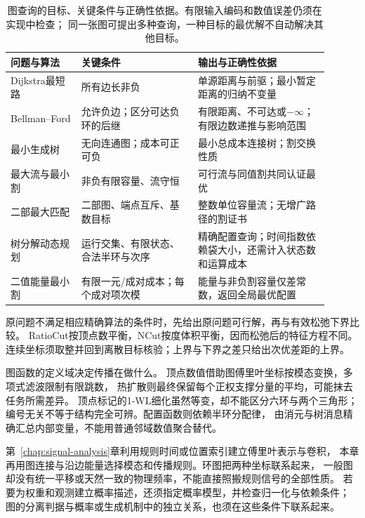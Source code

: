 \begin{table}[htbp]
  \centering
  \caption{图查询的目标、关键条件与正确性依据。有限输入编码和数值误差仍须在实现中检查；
  同一张图可提出多种查询，一种目标的最优解不自动解决其他目标。}
  \label{tab:graph-algorithm-conditions}
  \begin{tabular}{p{0.20\linewidth}p{0.33\linewidth}p{0.37\linewidth}}
    \toprule
    问题与算法 & 关键条件 & 输出与正确性依据\\
    \midrule
    Dijkstra最短路 & 所有边长非负 & 单源距离与前驱；最小暂定距离的归纳不变量\\
    Bellman--Ford & 允许负边；区分可达负环的后继 & 有限距离、不可达或\(-\infty\)；
      有限边数递推与影响范围\\
    最小生成树 & 无向连通图；成本可正可负 & 最小总成本连接树；割交换性质\\
    最大流与最小割 & 非负有限容量、流守恒 & 可行流与同值割共同认证最优\\
    二部最大匹配 & 二部图、端点互斥、基数目标 & 整数单位容量流；无增广路径的割证书\\
    树分解动态规划 & 运行交集、有限状态、合法半环与次序 &
      精确配置查询；时间指数依赖袋大小，还需计入状态数和运算成本\\
    二值能量最小割 & 有限一元/成对成本；每个成对项次模 &
      能量与非负割容量仅差常数，返回全局最优配置\\
    \bottomrule
  \end{tabular}
\end{table}

原问题不满足相应精确算法的条件时，先给出原问题可行解，再与有效松弛下界比较。
RatioCut按顶点数平衡，NCut按度体积平衡，因而松弛后的特征方程不同。
连续坐标须取整并回到离散目标核验；上界与下界之差只给出次优差距的上界。

图函数的定义域决定传播在做什么。
顶点数值借助图傅里叶坐标按模态变换，多项式滤波限制有限跳数，
热扩散则最终保留每个正权支撑分量的平均，可能抹去任务所需差异。
顶点标记的1-WL细化虽然等变，却不能区分六环与两个三角形；
编号无关不等于结构完全可辨。配置函数则依赖半环分配律，
由消元与树消息精确汇总内部变量，不能用普通邻域数值聚合替代。

第~\ref{chap:signal-analysis}章利用规则时间或位置索引建立傅里叶表示与卷积，
本章再用图连接与沿边能量选择模态和传播规则。环图把两种坐标联系起来，
一般图却没有统一平移或天然一致的物理频率，不能直接照搬规则信号的全部性质。
若要为权重和观测建立概率描述，还须指定概率模型，并检查归一化与依赖条件；
图的分离判据与概率或生成机制中的独立关系，也须在这些条件下联系起来。
